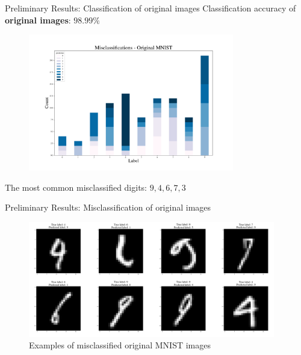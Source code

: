 \documentclass[10pt, t]{beamer}
\begin{document}
\begin{frame}{Preliminary Results: Classification of original images}
Classification accuracy of \textbf{original images}: $98.99\%$ \\
\pause 
\begin{figure}
	\includegraphics[width = 0.8\textwidth]{images/misclassifications_counts_original_mnist.png}
\end{figure}
The most common misclassified digits: $9,4,6,7, 3$

\end{frame}
\begin{frame}{Preliminary Results: Misclassification of original images}
	\begin{figure}
		\includegraphics[width = 0.96\textwidth]{images/misclass_original_mnist_examples.png}
		\caption{Examples of misclassified original MNIST images}
	\end{figure}
\end{frame}
\end{document}
